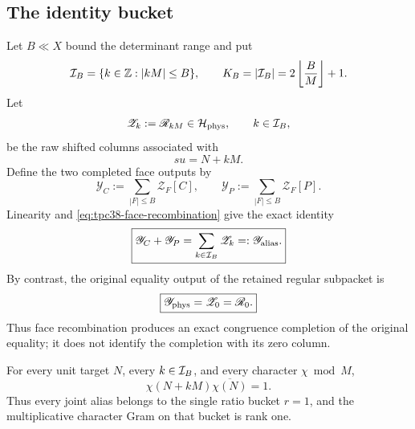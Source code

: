 \subsection{The identity bucket}

Let \(B\ll X\) bound the determinant range and put
\begin{equation}
 \mathcal I_B=\{k\in\mathbb Z:|kM|\le B\},
 \qquad K_B=|\mathcal I_B|=2\left\lfloor\frac BM\right\rfloor+1.
 \label{eq:tpc38-alias-index-set}
\end{equation}
Let
\begin{equation}
 \mathscr Z_k:=\mathscr R_{kM}\in\mathcal H_{\rm phys},
 \qquad k\in\mathcal I_B,
 \label{eq:tpc38-Zk}
\end{equation}
be the raw shifted columns associated with
\begin{equation}
 su=N+kM.
 \label{eq:tpc38-joint-shifted-equality}
\end{equation}
Define the two completed face outputs by
\begin{equation}
 \mathscr Y_C:=\sum_{|F|\le B}\mathscr Z_F[C],
 \qquad
 \mathscr Y_P:=\sum_{|F|\le B}\mathscr Z_F[P].
 \label{eq:tpc38-completed-face-outputs}
\end{equation}
Linearity and \eqref{eq:tpc38-face-recombination} give the exact identity
\begin{equation}
 \boxed{
 \mathscr Y_C+\mathscr Y_P
 =\sum_{k\in\mathcal I_B}\mathscr Z_k
 =:\mathscr Y_{\rm alias}.}
 \label{eq:tpc38-joint-output}
\end{equation}
By contrast, the original equality output of the retained regular subpacket is
\begin{equation}
 \boxed{\mathscr Y_{\rm phys}=\mathscr Z_0=\mathscr R_0.}
 \label{eq:tpc38-original-versus-alias-output}
\end{equation}
Thus face recombination produces an exact congruence completion of the
original equality; it does not identify the completion with its zero
column.

\begin{proposition}
\label{prop:tpc38-character-blindness}
For every unit target \(N\), every \(k\in\mathcal I_B\), and every character
\(\chi\bmod M\),
\begin{equation}
 \chi(N+kM)\overline{\chi(N)}=1.
 \label{eq:tpc38-character-phase-one}
\end{equation}
Thus every joint alias belongs to the single ratio bucket \(r=1\), and the
multiplicative character Gram on that bucket is rank one.
\end{proposition}

